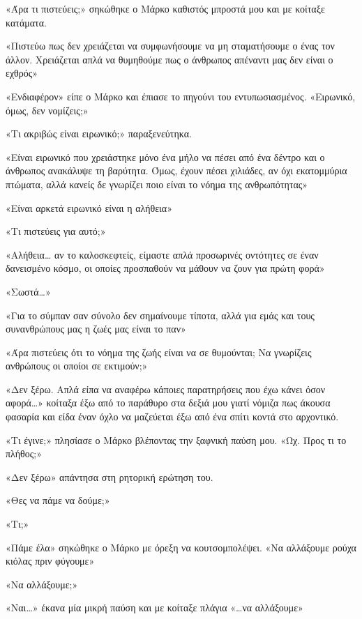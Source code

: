 \documentclass[12pt,twoside, openany]{book}
\begin{document}
«Άρα τι πιστεύεις;» σηκώθηκε ο Μάρκο καθιστός μπροστά μου και με κοίταξε κατάματα.

«Πιστεύω πως δεν χρειάζεται να συμφωνήσουμε να μη σταματήσουμε ο ένας τον άλλον. Χρειάζεται απλά να θυμηθούμε πως ο άνθρωπος απέναντι μας δεν είναι ο εχθρός»

«Ενδιαφέρον» είπε ο Μάρκο και έπιασε το πηγούνι του εντυπωσιασμένος. «Ειρωνικό, όμως, δεν νομίζεις;»

«Τι ακριβώς είναι ειρωνικό;» παραξενεύτηκα.

«Είναι ειρωνικό που χρειάστηκε μόνο ένα μήλο να πέσει από ένα δέντρο και ο άνθρωπος ανακάλυψε τη βαρύτητα. Όμως, έχουν πέσει χιλιάδες, αν όχι εκατομμύρια πτώματα, αλλά κανείς δε γνωρίζει ποιο είναι το νόημα της ανθρωπότητας»

«Είναι αρκετά ειρωνικό είναι η αλήθεια»

«Τι πιστεύεις για αυτό;»

«Αλήθεια… αν το καλοσκεφτείς, είμαστε απλά προσωρινές οντότητες σε έναν δανεισμένο κόσμο, οι οποίες προσπαθούν να μάθουν να ζουν για πρώτη φορά»

«Σωστά…»

«Για το σύμπαν σαν σύνολο δεν σημαίνουμε τίποτα, αλλά για εμάς και τους συνανθρώπους μας η ζωές μας είναι το παν»

«Άρα πιστεύεις ότι το νόημα της ζωής είναι να σε θυμούνται; Να γνωρίζεις ανθρώπους οι οποίοι σε εκτιμούν;»

«Δεν ξέρω. Απλά είπα να αναφέρω κάποιες παρατηρήσεις που έχω κάνει όσον αφορά…» κοίταξα έξω από το παράθυρο στα δεξιά μου γιατί νόμιζα πως άκουσα φασαρία και είδα έναν όχλο να μαζεύεται έξω από ένα σπίτι κοντά στο αρχοντικό.

«Τι έγινε;» πλησίασε ο Μάρκο βλέποντας την ξαφνική παύση μου. «Ωχ. Προς τι το πλήθος;»

«Δεν ξέρω» απάντησα στη ρητορική ερώτηση του.

«Θες να πάμε να δούμε;»

«Τι;»

«Πάμε έλα» σηκώθηκε ο Μάρκο με όρεξη να κουτσομπολέψει. «Να αλλάξουμε ρούχα κιόλας πριν φύγουμε»

«Να αλλάξουμε;»

«Ναι…» έκανα μία μικρή παύση και με κοίταξε πλάγια «…να αλλάξουμε»


\chapter{}
\end{document}
